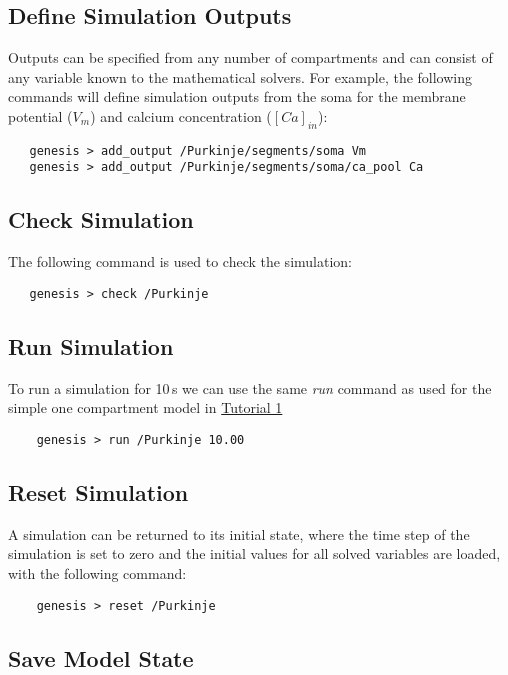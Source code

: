 \documentclass[12pt]{article}
\begin{document}
\subsection*{Define Simulation Outputs}

Outputs can be specified from any number of compartments and can consist of any variable known to the mathematical solvers. For example, the following commands will define simulation outputs from the soma for the membrane potential ($V_m$) and calcium concentration ($[Ca]_{in}$):
\begin{verbatim}
   genesis > add_output /Purkinje/segments/soma Vm
   genesis > add_output /Purkinje/segments/soma/ca_pool Ca
\end{verbatim}

\subsection*{Check Simulation}

The following command is used to check the simulation:
\begin{verbatim}
   genesis > check /Purkinje
\end{verbatim}

\subsection*{Run Simulation}

To run a simulation for 10\,s we can use the same {\it run} command as used for the simple one compartment model in \href{../tutorial1/tutorial1.tex}{Tutorial 1}
\begin{verbatim}
    genesis > run /Purkinje 10.00
\end{verbatim}

\subsection*{Reset Simulation}

A simulation can be returned to its initial state, where the time step of the simulation is set to zero and the initial values for all solved variables are loaded, with the following command:
\begin{verbatim}
    genesis > reset /Purkinje
\end{verbatim}

\subsection*{Save Model State}
\end{document}
